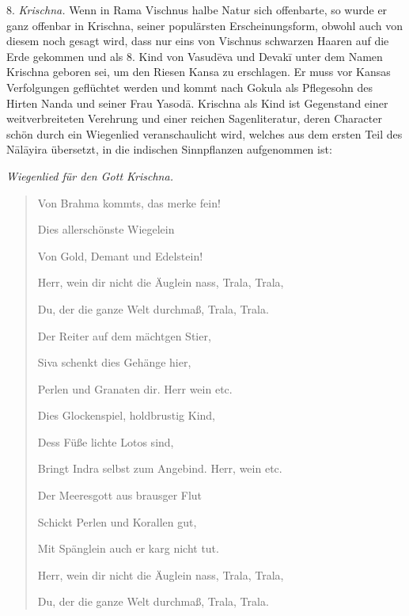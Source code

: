 \documentclass{article}
\begin{document}
8. \emph{Krischna.} Wenn in Rama Vischnus halbe Natur sich offenbarte, so wurde er ganz offenbar in Krischna, seiner populärsten Erscheinungsform, obwohl auch von diesem noch gesagt wird, dass nur eins von Vischnus schwarzen Haaren auf die Erde gekommen und als 8. Kind von Vasud\={e}va und Devak\={i} unter dem Namen Krischna geboren sei, um den Riesen Kansa zu erschlagen. Er muss vor Kansas Verfolgungen geflüchtet werden und kommt nach Gokula als Pflegesohn des Hirten Nanda und seiner Frau Yasod\={a}. Krischna als Kind ist Gegenstand einer weitverbreiteten Verehrung und einer reichen Sagenliteratur, deren Character schön durch ein Wiegenlied veranschaulicht wird, welches aus dem ersten Teil des N\={a}l\={a}yira übersetzt, in die indischen Sinnpflanzen aufgenommen ist:
\begin{center}
\emph{Wiegenlied für den Gott Krischna.}
\end{center}
\begin{quotation}\small
Von Brahma kommts, das merke fein!

Dies allerschönste Wiegelein

Von Gold, Demant und Edelstein!

Herr, wein dir nicht die Äuglein nass, Trala, Trala,

Du, der die ganze Welt durchmaß, Trala, Trala.

\bigskip

Der Reiter auf dem mächtgen Stier,

Siva schenkt dies Gehänge hier,

Perlen und Granaten dir. Herr wein etc.

\bigskip

Dies Glockenspiel, holdbrustig Kind,

Dess Füße lichte Lotos sind,

Bringt Indra selbst zum Angebind. Herr, wein etc.

\bigskip

Der Meeresgott aus brausger Flut

Schickt Perlen und Korallen gut,

Mit Spänglein auch er karg nicht tut.

Herr, wein dir nicht die Äuglein nass, Trala, Trala,

Du, der die ganze Welt durchmaß, Trala, Trala.
\end{quotation}
\end{document}
